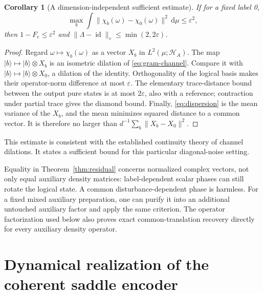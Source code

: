 \documentclass[aip,adv,reprint,onecolumn,amsmath,amssymb]{revtex4-2}
\newcommand{\dd}{\mathrm d}
\newcommand{\ket}[1]{\lvert #1\rangle}
\newtheorem{corollary}[theorem]{Corollary}
\begin{document}
\begin{corollary}[A dimension-independent sufficient estimate]
If for a fixed label 0,
\begin{equation}
 \max_b\int\|\chi_b(\omega)-\chi_0(\omega)\|^2\,\dd\mu\le\varepsilon^2,
 \label{eq:approx-condition}
\end{equation}
then $1-F_e\le\varepsilon^2$ and $\|\Lambda-\operatorname{id}\|_\diamond\le\min(2,2\varepsilon)$.
\end{corollary}
\begin{proof}
Regard $\omega\mapsto\chi_b(\omega)$ as a vector $X_b$ in $L^2(\mu;\mathcal H_A)$. The map $\ket b\mapsto\ket b\otimes X_b$ is an isometric dilation of \eqref{eq:gram-channel}. Compare it with $\ket b\mapsto\ket b\otimes X_0$, a dilation of the identity. Orthogonality of the logical basis makes their operator-norm difference at most $\varepsilon$. The elementary trace-distance bound between the output pure states is at most $2\varepsilon$, also with a reference; contraction under partial trace gives the diamond bound. Finally, \eqref{eq:dispersion} is the mean variance of the $X_b$, and the mean minimizes squared distance to a common vector. It is therefore no larger than $d^{-1}\sum_b\|X_b-X_0\|^2$.
\end{proof}
This estimate is consistent with the established continuity theory of channel dilations.\cite{ksw} It states a sufficient bound for this particular diagonal-noise setting.


Equality in Theorem~\ref{thm:residual} concerns normalized complex vectors, not only equal auxiliary density matrices: label-dependent scalar phases can still rotate the logical state. A common disturbance-dependent phase is harmless. For a fixed mixed auxiliary preparation, one can purify it into an additional untouched auxiliary factor and apply the same criterion. The operator factorization used below also proves exact common-translation recovery directly for every auxiliary density operator.
\section{Dynamical realization of the coherent saddle encoder}\label{sec:dynamics}
\end{document}
